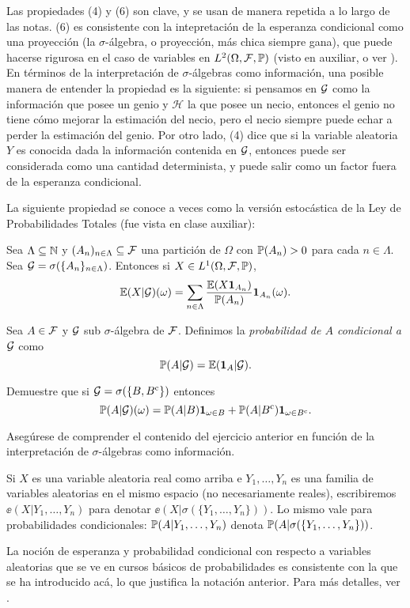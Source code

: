 Las propiedades (4) y (6) son clave, y se usan de manera repetida a lo largo de las notas.
(6) es consistente con la intepretación de la esperanza condicional como una proyección (la $\sigma$-álgebra, o proyección, más chica siempre gana), que puede hacerse rigurosa en el caso de variables en $L^2(\Omega,\mathcal{F},\mathbb{P})$ (visto en auxiliar, o ver \cite[Teo. 5.1.8]{durrett}).
En términos de la interpretación de $\sigma$-álgebras como información, una posible manera de entender la propiedad es la siguiente: si pensamos en $\mathcal{G}$ como la información que posee un genio y $\mathcal{H}$ la que posee un necio, entonces el genio no tiene cómo mejorar la estimación del necio, pero el necio siempre puede echar a perder la estimación del genio.
Por otro lado, (4) dice que si la variable aleatoria $Y$ es conocida dada la información contenida en $\mathcal{G}$, entonces puede ser considerada como una cantidad determinista, y puede salir como un factor fuera de la esperanza condicional.

La siguiente propiedad se conoce a veces como la versión estocástica de la Ley de Probabilidades Totales (fue vista en clase auxiliar):

\begin{prop}\label{prop:totProbEst}
Sea $\Lambda\subseteq\mathbb{N}$ y $(A_n)_{n\in\Lambda}\subseteq\mathcal{F}$ una partición de $\Omega$ con $\mathbb{P}(A_n)>0$ para cada $n\in\Lambda$.
Sea $\mathcal{G}=\sigma(\{A_n\}_{n\in\Lambda})$.
Entonces si $X\in L^1(\Omega,\mathcal{F},\mathbb{P})$,
\[\mathbb{E}(X|\mathcal{G})(\omega)=\sum_{n\in\Lambda}\frac{\mathbb{E}(X\mathbf{1}_{A_n})}{\mathbb{P}(A_n)}\mathbf{1}_{A_n}(\omega).\]
\end{prop}

\begin{def}
Sea $A\in\mathcal{F}$ y $\mathcal{G}$ sub $\sigma$-álgebra de $\mathcal{F}$.
Definimos la \emph{probabilidad de $A$ condicional a $\mathcal{G}$} como
\[\mathbb{P}(A|\mathcal{G})=\mathbb{E}(\mathbf{1}_{A}|\mathcal{G}).\]
\end{def}

\begin{exer}\label{ex:probCond}
Demuestre que si $\mathcal{G}=\sigma(\{B,B^{\text{\upshape{c}}}\})$ entonces
\[\mathbb{P}(A|\mathcal{G})(\omega)=\mathbb{P}(A|B)\mathbf{1}_{\omega\in B}+\mathbb{P}(A|B^{\text{\upshape{c}}})\mathbf{1}_{\omega\in B^{\text{\upshape{c}}}}.\]
\end{exer}

\begin{sqgnote}
Asegúrese de comprender el contenido del ejercicio anterior en función de la interpretación de $\sigma$-álgebras como información.
\end{sqgnote}

\begin{notation}
Si $X$ es una variable aleatoria real como arriba e $Y_1,\dotsc,Y_n$ es una familia de variables aleatorias en el mismo espacio (no necesariamente reales), escribiremos $\ee(X|Y_1,\dotsc,Y_n)$ para denotar $\ee(X|\sigma(\{Y_1,\dotsc,Y_n\}))$.
Lo mismo vale para probabilidades condicionales: $\mathbb{P}(A|Y_1,\dotsc,Y_n)$ denota $\mathbb{P}(A|\sigma(\{Y_1,\dotsc,Y_n\}))$.	
\end{notation}

\begin{rem}
La noción de esperanza y probabilidad condicional con respecto a variables aleatorias que se ve en cursos básicos de probabilidades es consistente con la que se ha introducido acá, lo que justifica la notación anterior.
Para más detalles, ver \cite[Cap. 5]{durrett} \ucmark.
\end{rem}